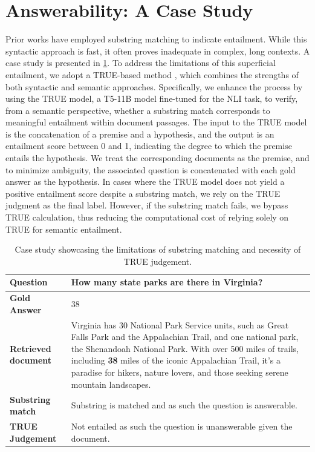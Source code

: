 \documentclass{article} %
\renewcommand{\cite}[1]{\citep{#1}}
\begin{document}
\section{Answerability: A Case Study} \label{sec: answerability-case-study}
Prior works \cite{liu-etal-2023-evaluating, gao2023enabling, ye2024effective, huang2024training, li2024improving} have employed substring matching to indicate entailment. While this syntactic approach is fast, it often proves inadequate in complex, long contexts. A case study is presented in \cref{table: true_case}. To address the limitations of this superficial entailment, we adopt a TRUE-based method \cite{honovich-etal-2022-true}, which combines the strengths of both syntactic and semantic approaches. Specifically, we enhance the process by using the TRUE model, a T5-11B model \cite{raffel2020exploring} fine-tuned for the NLI task, to verify, from a semantic perspective, whether a substring match corresponds to meaningful entailment within document passages. The input to the TRUE model is the concatenation of a premise and a hypothesis, and the output is an entailment score between 0 and 1, indicating the degree to which the premise entails the hypothesis. We treat the corresponding documents as the premise, and to minimize ambiguity, the associated question is concatenated with each gold answer as the hypothesis. In cases where the TRUE model does not yield a positive entailment score despite a substring match, we rely on the TRUE judgment as the final label. However, if the substring match fails, we bypass TRUE calculation, thus reducing the computational cost of relying solely on TRUE for semantic entailment.


\begin{table}[htb!]
\caption{Case study showcasing the limitations of substring matching and necessity of TRUE judgement.}
\label{table: true_case}

\centering
\begin{tabular}{lp{10cm}}
\hline
\textbf{Question} & How many state parks are there in Virginia? \\
\hline
\textbf{Gold Answer} & 38 \\
\hline
\textbf{Retrieved document} & Virginia has 30 National Park Service units, such as Great Falls Park and the Appalachian Trail, and one national park, the Shenandoah National Park. With over 500 miles of trails, including \textbf{38} miles of the iconic Appalachian Trail, it’s a paradise for hikers, nature lovers, and those seeking serene mountain landscapes. \\
\hline
\textbf{Substring match} & Substring is matched and as such the question is answerable. \\
\hline
\textbf{TRUE Judgement} & Not entailed as such the question is unanswerable given the document. \\
\hline
\end{tabular}
\end{table}
\end{document}
